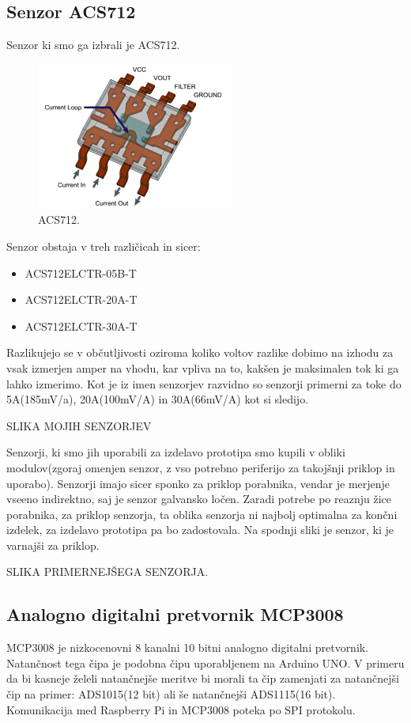 \documentclass[12pt,a4paper,titlepage,openany]{report}
\begin{document}
\subsection{Senzor ACS712}
Senzor ki smo ga izbrali je ACS712.


\begin{figure}[H]
\begin{center}
\includegraphics[width=0.5\linewidth]{Slike/ACS712.jpg}
\end{center}
\caption{ACS712.}\label{slika:ACS712}
\end{figure}

Senzor obstaja v treh različicah in sicer:

\begin{itemize}
\item ACS712ELCTR-05B-T
\item ACS712ELCTR-20A-T
\item ACS712ELCTR-30A-T
\end{itemize}

Razlikujejo se v občutljivosti oziroma koliko voltov razlike dobimo na izhodu za vsak izmerjen amper na vhodu, kar vpliva na to, kakšen je maksimalen tok ki ga lahko izmerimo. Kot je iz imen senzorjev razvidno so senzorji primerni za toke do 5A(185mV/a), 20A(100mV/A) in 30A(66mV/A) kot si sledijo.


SLIKA MOJIH SENZORJEV

Senzorji, ki smo jih uporabili za izdelavo prototipa smo kupili v obliki modulov(zgoraj omenjen senzor, z vso potrebno periferijo za takojšnji priklop in uporabo). Senzorji imajo sicer sponko za priklop porabnika, vendar je merjenje vseeno indirektno, saj je senzor galvansko ločen. Zaradi potrebe po reaznju žice porabnika, za priklop senzorja, ta oblika senzorja ni najbolj optimalna za končni izdelek, za izdelavo prototipa pa bo zadostovala. Na spodnji sliki je senzor, ki je varnajši za priklop.

SLIKA PRIMERNEJŠEGA SENZORJA.

\subsection{Analogno digitalni pretvornik MCP3008}
MCP3008 je nizkocenovni 8 kanalni 10 bitni analogno digitalni pretvornik. Natančnost tega čipa je podobna čipu uporabljenem na Arduino UNO. V primeru da bi kasneje želeli natančnejše meritve bi morali ta čip zamenjati za natančnejši čip na primer: ADS1015(12 bit) ali še natančnejši ADS1115(16 bit). Komunikacija med Raspberry Pi in MCP3008 poteka po SPI protokolu.
\end{document}
